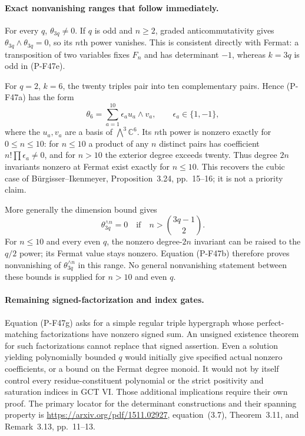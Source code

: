 \paragraph{Exact nonvanishing ranges that follow immediately.}
For every $q$, $\theta_{3q}\ne0$. If $q$ is odd and
$n\ge2$, graded anticommutativity gives
$\theta_{3q}\wedge\theta_{3q}=0$, so its $n$th power
vanishes. This is consistent directly with Fermat:
a transposition of two variables fixes $F_n$ and has
determinant $-1$, whereas $k=3q$ is odd in (P-F47e).

For $q=2$, $k=6$, the twenty triples pair into ten
complementary pairs. Hence (P-F47a) has the form
\[
          \theta_6=\sum_{a=1}^{10}\epsilon_a u_a\wedge v_a,
             \qquad \epsilon_a\in\{1,-1\},              \tag{P-F47h}
\]
where the $u_a,v_a$ are a basis of $\bigwedge^3\mathbb C^6$.
Its $n$th power is nonzero exactly for $0\le n\le10$:
for $n\le10$ a product of any $n$ distinct pairs has
coefficient $n!\prod\epsilon_a\ne0$, and for $n>10$
the exterior degree exceeds twenty. Thus degree $2n$
invariants nonzero at Fermat exist exactly for $n\le10$.
This recovers the cubic case of B\"urgisser--Ikenmeyer,
Proposition~3.24, pp.~15--16; it is not a priority claim.

More generally the dimension bound gives
\[
      \theta_{3q}^{\wedge n}=0
           \quad\text{if}\quad
                  n>\binom{3q-1}{2}.                   \tag{P-F47i}
\]
For $n\le10$ and every even $q$, the nonzero degree-$2n$
invariant can be raised to the $q/2$ power; its Fermat
value stays nonzero. Equation (P-F47b) therefore proves
nonvanishing of $\theta_{3q}^{\wedge n}$ in this range.
No general nonvanishing statement between these bounds
is supplied for $n>10$ and even $q$.

\paragraph{Remaining signed-factorization and index gates.}
Equation (P-F47g) asks for a simple regular triple
hypergraph whose perfect-matching factorizations have
nonzero signed sum. An unsigned existence theorem for
such factorizations cannot replace that signed assertion.
Even a solution yielding polynomially bounded $q$ would
initially give specified actual nonzero coefficients,
or a bound on the Fermat degree monoid. It would not
by itself control every residue-constituent polynomial
or the strict positivity and saturation indices in
GCT VI. Those additional implications require their
own proof. The primary locator for the determinant
constructions and their spanning property is
\url{https://arxiv.org/pdf/1511.02927}, equation~(3.7),
Theorem~3.11, and Remark~3.13, pp.~11--13.
